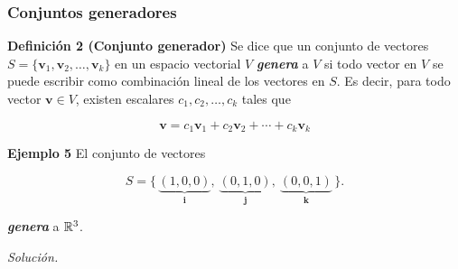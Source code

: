 \begin{frame}\frametitle{Conjuntos generadores}

\begin{block}{\textbf{Definición 2 (Conjunto generador)}}
	\justifying
	Se dice que un conjunto de vectores $S=\{\mathbf{v}_1,\mathbf{v}_2,\hdots,\mathbf{v}_k\}$ en un espacio 
	vectorial $V$ \textbf{\textit{genera}} a $V$ si todo vector en $V$ se puede escribir como combinación lineal
	de los vectores en $S$. Es decir, para todo vector $\mathbf{v}\in V$, existen escalares $c_1,c_2,\hdots,c_k$
	tales que 
	
	\vspace{-3mm}
	\[
		\mathbf{v} = c_1\mathbf{v}_1 + c_2\mathbf{v}_2 + \cdots + c_k\mathbf{v}_k
	\]
	
\end{block}

\vspace{0mm}

\begin{ej}{\textbf{Ejemplo 5}} \justifying
	El conjunto de vectores
	
	\vspace{-2mm}
	\[
	S = \{ \, \underbrace{(1,0,0)}_{\mathbf{i}}, \ \underbrace{(0,1,0)}_{\mathbf{j}}, \ 
	\underbrace{(0,0,1)}_{\mathbf{k}} \, \}.
	\]
	
	\vspace{-3mm}
	\textbf{\textit{genera}} a $\mathbb{R}^3$.
\end{ej}

\textit{Solución.}	
	
\end{frame}


\subsection{}

